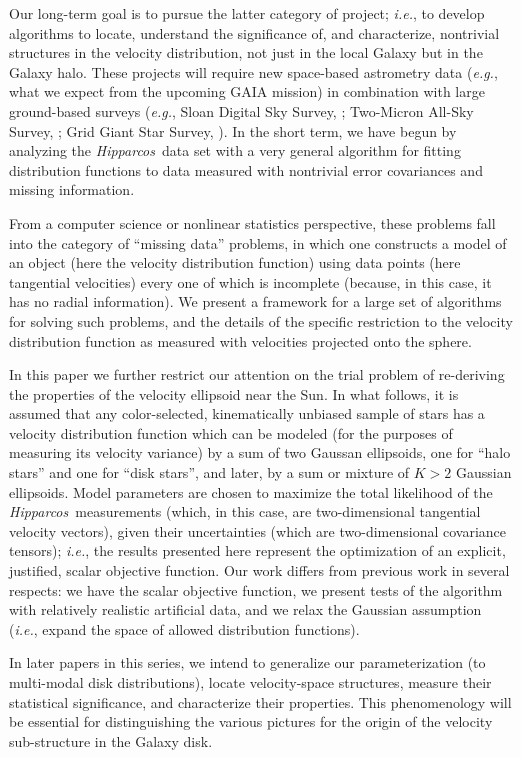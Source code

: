 \documentclass[12pt,preprint]{aastex}
\newcommand{\latin}[1]{\textit{#1}}
\newcommand{\eg}{\latin{e.g.}}
\newcommand{\ie}{\latin{i.e.}}
\newcommand{\Hipparcos}{\textit{Hipparcos}}
\begin{document}
Our long-term goal is to pursue the latter category of project; \ie,
to develop algorithms to locate, understand the significance of, and
characterize, nontrivial structures in the velocity distribution, not
just in the local Galaxy but in the Galaxy halo.  These projects will
require new space-based astrometry data (\eg, what we expect from the
upcoming GAIA mission) in combination with large ground-based surveys
(\eg, Sloan Digital Sky Survey, \citealt{york00a}; Two-Micron All-Sky
Survey, \citealt{skrutskie97a}; Grid Giant Star Survey,
\citealt{majewski00a}).  In the short term, we have begun by analyzing
the \Hipparcos\ data set with a very general algorithm for fitting
distribution functions to data measured with nontrivial error
covariances and missing information.

From a computer science or nonlinear statistics perspective, these
problems fall into the category of ``missing data'' problems, in which
one constructs a model of an object (here the velocity
distribution function) using data points (here tangential velocities)
every one of which is incomplete (because, in this case, it has no radial
information).  We present a framework for a large set of
algorithms for solving such problems, and the details of the specific
restriction to the velocity distribution function as measured with
velocities projected onto the sphere.

In this paper we further restrict our attention on the trial problem
of re-deriving the properties of the velocity ellipsoid near the Sun.
In what follows, it is assumed that any color-selected, kinematically
unbiased sample of stars has a velocity distribution function which
can be modeled (for the purposes of measuring its velocity variance)
by a sum of two Gaussan ellipsoids, one for ``halo stars'' and one for
``disk stars'', and later, by a sum or mixture of $K>2$ Gaussian
ellipsoids.  Model parameters are chosen to maximize the total
likelihood of the \Hipparcos\ measurements (which, in this case, are
two-dimensional tangential velocity vectors), given their
uncertainties (which are two-dimensional covariance tensors); \ie, the
results presented here represent the optimization of an explicit,
justified, scalar objective function.  Our work differs from previous
work in several respects: we have the scalar objective function, we
present tests of the algorithm with relatively realistic artificial
data, and we relax the Gaussian assumption (\ie, expand the space of
allowed distribution functions).

In later papers in this series, we intend to generalize our
parameterization (to multi-modal disk distributions), locate
velocity-space structures, measure their statistical significance, and
characterize their properties.  This phenomenology will be essential
for distinguishing the various pictures for the origin of the velocity
sub-structure in the Galaxy disk.
\end{document}
